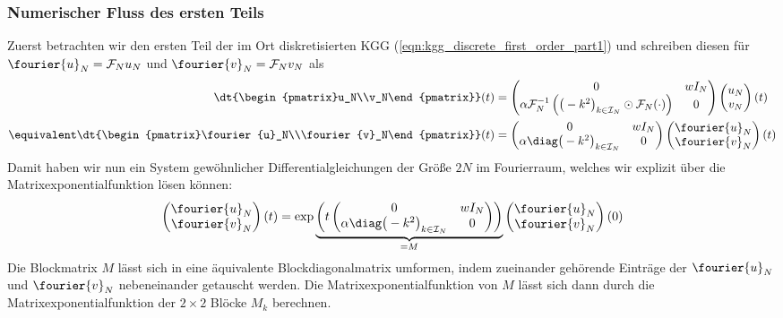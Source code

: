 \subsubsection*{Numerischer Fluss des ersten Teils}
Zuerst betrachten wir den ersten Teil der im Ort diskretisierten KGG (\ref{eqn:kgg_discrete_first_order_part1}) und schreiben diesen für $\fourier{u}_N=\mathcal{F}_Nu_N$ und $\fourier{v}_N=\mathcal{F}_Nv_N$ als
\begin{align*}
\dt{\begin{pmatrix}u_N\\v_N\end{pmatrix}}(t)&=
\begin{pmatrix}0 & wI_N\\ \alpha\mathcal{F}_N^{-1}\left(\big(-k^2\big)_{k\in\mathcal{I}_N}\odot\mathcal{F}_N (\cdot )\right) & 0\end{pmatrix}
\begin{pmatrix}u_N\\v_N\end{pmatrix}(t)\\
\equivalent 
\dt{\begin{pmatrix}\fourier{u}_N\\\fourier{v}_N\end{pmatrix}}(t)&=
\begin{pmatrix}0 & wI_N\\ \alpha\diag\big(-k^2\big)_{k\in\mathcal{I}_N} & 0\end{pmatrix}
\begin{pmatrix}\fourier{u}_N\\\fourier{v}_N\end{pmatrix}(t)
\end{align*}
Damit haben wir nun ein System gewöhnlicher Differentialgleichungen der Größe $2N$ im Fourierraum, welches wir explizit über die Matrixexponentialfunktion lösen können:
\[\begin{pmatrix}\fourier{u}_N\\\fourier{v}_N\end{pmatrix}(t)=\exp\underbrace{\left(t\begin{pmatrix}0 & wI_N\\ \alpha\diag\big(-k^2\big)_{k\in\mathcal{I}_N} & 0\end{pmatrix}\right)}_{=M}
\begin{pmatrix}\fourier{u}_N\\\fourier{v}_N\end{pmatrix}(0)\]
Die Blockmatrix $M$ lässt sich in eine äquivalente Blockdiagonalmatrix umformen, indem zueinander gehörende Einträge der $\fourier{u}_N$ und $\fourier{v}_N$ nebeneinander getauscht werden. Die Matrixexponentialfunktion von $M$ lässt sich dann durch die Matrixexponentialfunktion der $2\times 2$ Blöcke $M_k$ berechnen. 
